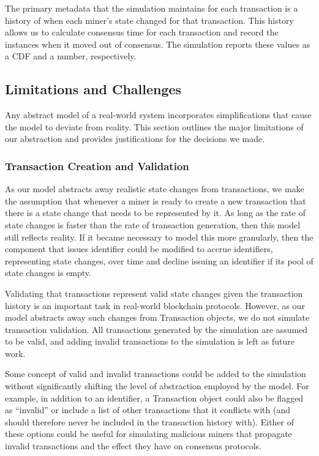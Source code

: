 \documentclass[letterpaper,11pt]{article}
\begin{document}
The primary metadata that the simulation maintains for each transaction is a history of when each miner's state changed for that transaction. This history allows us to calculate consensus time for each transaction and record the instances when it moved out of consensus. The simulation reports these values as a CDF and a number, respectively.

\subsection{Limitations and Challenges}
Any abstract model of a real-world system incorporates simplifications that cause the model to deviate from reality. This section outlines the major limitations of our abstraction and provides justifications for the decisions we made.

\subsubsection{Transaction Creation and Validation}
As our model abstracts away realistic state changes from transactions, we make the assumption that whenever a miner is ready to create a new transaction that there is a state change that needs to be represented by it. As long as the rate of state changes is faster than the rate of transaction generation, then this model still reflects reality. If it became necessary to model this more granularly, then the component that issues identifier could be modified to accrue identifiers, representing state changes, over time and decline issuing an identifier if its pool of state changes is empty.

Validating that transactions represent valid state changes given the transaction history is an important task in real-world blockchain protocols. However, as our model abstracts away such changes from Transaction objects, we do not simulate transaction validation. All transactions generated by the simulation are assumed to be valid, and adding invalid transactions to the simulation is left as future work. 

Some concept of valid and invalid transactions could be added to the simulation without significantly shifting the level of abstraction employed by the model. For example, in addition to an identifier, a Transaction object could also be flagged as ``invalid'' or include a list of other transactions that it conflicts with (and should therefore never be included in the transaction history with). Either of these options could be useful for simulating malicious miners that propagate invalid transactions and the effect they have on consensus protocols.
\end{document}

